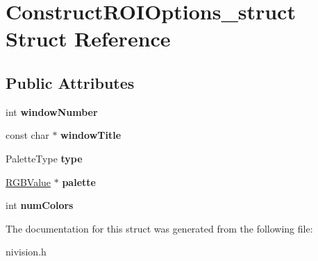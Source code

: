 \hypertarget{structConstructROIOptions__struct}{
\section{ConstructROIOptions\_\-struct Struct Reference}
\label{structConstructROIOptions__struct}
}
\subsection*{Public Attributes}
\begin{DoxyCompactItemize}
\item 
\hypertarget{structConstructROIOptions__struct_aa79808d9893ba5ac0b202e00a442938a}{
int {\bfseries windowNumber}}
\label{structConstructROIOptions__struct_aa79808d9893ba5ac0b202e00a442938a}

\item 
\hypertarget{structConstructROIOptions__struct_ad9fdfb449266ec1b91f56d80818c0dd7}{
const char $\ast$ {\bfseries windowTitle}}
\label{structConstructROIOptions__struct_ad9fdfb449266ec1b91f56d80818c0dd7}

\item 
\hypertarget{structConstructROIOptions__struct_a37340f2ad3d1405d9983a674e48cdebb}{
PaletteType {\bfseries type}}
\label{structConstructROIOptions__struct_a37340f2ad3d1405d9983a674e48cdebb}

\item 
\hypertarget{structConstructROIOptions__struct_a6dbefaa7f7d7335de5988a05b7b9cd66}{
\hyperlink{structRGBValue__struct}{RGBValue} $\ast$ {\bfseries palette}}
\label{structConstructROIOptions__struct_a6dbefaa7f7d7335de5988a05b7b9cd66}

\item 
\hypertarget{structConstructROIOptions__struct_a9b55f0321abbbd79894d843b9e6b6b80}{
int {\bfseries numColors}}
\label{structConstructROIOptions__struct_a9b55f0321abbbd79894d843b9e6b6b80}

\end{DoxyCompactItemize}


The documentation for this struct was generated from the following file:\begin{DoxyCompactItemize}
\item 
nivision.h\end{DoxyCompactItemize}
